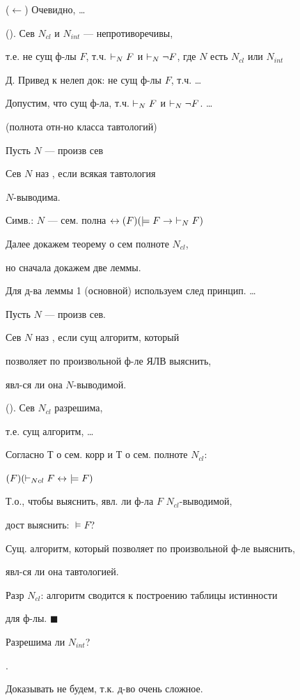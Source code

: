 ($\leftarrow$) Очевидно, \dots\par
{} (). Сев $N_{cl}$ и $N_{int}$ --- непротиворечивы,\par
т.е. не сущ ф-лы $F$, т.ч. $\vdash_{N} F$ и $\vdash_{N}\neg F$, где $N$ есть $N_{cl}$ или $N_{int}$\par
Д. Привед к нелеп док: не сущ ф-лы $F$, т.ч. \dots\par
Допустим, что сущ ф-ла, т.ч. $\vdash_{N} F$ и $\vdash_{N}\neg F$. \dots\par
{} (полнота отн-но класса тавтологий)\par
Пусть $N$ --- произв сев\par
Сев $N$ наз , если всякая тавтология\par
$N$-выводима.\par
Симв.: $N$ --- сем. полна $\leftrightarrow(F)(\models F\to\ \nv F)$\par
Далее докажем теорему о сем полноте $N_{cl}$,\par
но сначала докажем две леммы.\par
Для д-ва леммы 1 (основной) используем след принцип. \dots\par
{}\par
Пусть $N$ --- произв сев.\par
\opr Сев $N$ наз , если сущ алгоритм, который\par
позволяет по произвольной ф-ле ЯЛВ выяснить,\par
явл-ся ли она $N$-выводимой.\par
{} (). Сев $N_{cl}$ разрешима,\par
т.е. сущ алгоритм, \dots\par
\dvo Согласно Т о сем. корр и Т о сем. полноте $N_{cl}$:\par
\hspace*{20mm}$(F)(\vdash_{Ncl} F\leftrightarrow\ \models F)$\par
Т.о., чтобы выяснить, явл. ли ф-ла $F$ $N_{cl}$-выводимой,\par
дост выяснить: $\models F$?\par
Сущ. алгоритм, который позволяет по произвольной ф-ле выяснить,\par
явл-ся ли она тавтологией.\par
Разр $N_{cl}$: алгоритм сводится к построению таблицы истинности\par
для ф-лы. $\blacksquare$\par
Разрешима ли $N_{int}$?\par
{}. \par
Доказывать не будем, т.к. д-во очень сложное.\par

